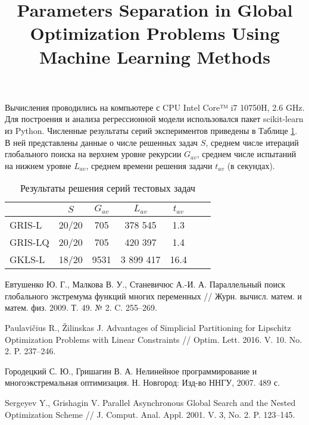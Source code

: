 \documentclass[11pt, oneside, a4paper]{article}
\begin{document}
Вычисления проводились на компьютере с CPU Intel Core™ i7 10750H, 2.6 GHz. Для построения и анализа регрессионной модели использовался пакет scikit-learn из Python.
Численные результаты серий экспериментов приведены в Таблице \ref{tab1}.
В ней представлены данные о числе решенных задач $S$, среднем числе итераций глобального поиска на верхнем уровне рекурсии $G_{av}$, среднем числе испытаний на нижнем уровне $L_{av}$, среднем времени решения задачи $t_{av}$ (в секундах).

\begin{table}[ht]
	\caption{Результаты решения серий тестовых задач}
	\label{tab1}
	\begin{center}
		\begin{tabular}{ l c c c c c c } \hline
		 & $S$ &  $G_{av}$ &  $L_{av}$ & $t_{av}$ \\
    \hline
		GRIS-L & 20/20  & 705 &  378 545 & 1.3 \\
		GRIS-LQ & 20/20 & 705 &  420 397 & 1.4 \\
		GKLS-L & 18/20 & 9531 &  3 899 417 & 16.4 \\
		\hline
		\end{tabular}
	\end{center}
\end{table}

\begin{biblio}

 Евтушенко Ю. Г., Малкова В. У., Станевичюс А.-И. А. Параллельный поиск глобального экстремума функций многих переменных // Журн. вычисл. матем. и матем. физ. 2009. Т. 49. № 2. C. 255--269.

 Paulavi{\v c}ius R., {\v Z}ilinskas J. Advantages of Simplicial Partitioning for Lipschitz Optimization Problems with Linear Constraints // Optim. Lett. 2016. V. 10. No. 2. P. 237--246.

 Городецкий С. Ю., Гришагин В. А. Нелинейное программирование и многоэкстремальная оптимизация. Н. Новгород: Изд-во ННГУ, 2007. 489 с.

 Sergeyev Y., Grishagin V. Parallel Asynchronous Global Search and the Nested Optimization Scheme // J. Comput. Anal. Appl. 2001. V. 3, No. 2. P. 123--145.



\end{biblio}

\title{Parameters Separation in Global Optimization Problems Using Machine Learning Methods}

\end{document}

